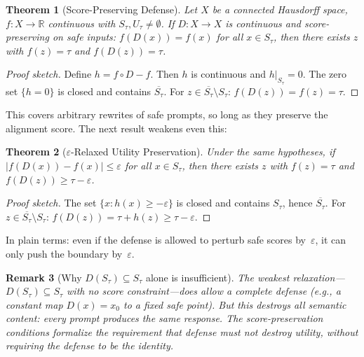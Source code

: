 \documentclass[11pt]{article}
\newtheorem{theorem}{Theorem}[section]
\newtheorem{remark}[theorem]{Remark}
\newcommand{\R}{\mathbb{R}}
\newcommand{\cl}[1]{\overline{#1}}
\begin{document}
\begin{theorem}[Score-Preserving Defense]
\label{thm:score-preserving}
Let $X$ be a connected Hausdorff space, $f\colon X\to\R$ continuous
with $S_\tau, U_\tau \neq \emptyset$. If $D\colon X \to X$ is
continuous and \emph{score-preserving on safe inputs}:
$f(D(x)) = f(x)$ for all $x \in S_\tau$, then there exists $z$ with
$f(z) = \tau$ and $f(D(z)) = \tau$.
\end{theorem}

\begin{proof}[Proof sketch]
Define $h = f \circ D - f$. Then $h$ is continuous and $h|_{S_\tau} = 0$.
The zero set $\{h = 0\}$ is closed and contains $\cl{S_\tau}$. For
$z \in \cl{S_\tau} \setminus S_\tau$: $f(D(z)) = f(z) = \tau$.
\end{proof}

This covers arbitrary rewrites of safe prompts, so long as they
preserve the alignment score. The next result weakens even this:

\begin{theorem}[$\varepsilon$-Relaxed Utility Preservation]
\label{thm:eps-relaxed}
Under the same hypotheses, if
$|f(D(x)) - f(x)| \leq \varepsilon$ for all $x \in S_\tau$, then
there exists $z$ with $f(z) = \tau$ and
$f(D(z)) \geq \tau - \varepsilon$.
\end{theorem}

\begin{proof}[Proof sketch]
The set $\{x : h(x) \geq -\varepsilon\}$ is closed and contains
$S_\tau$, hence $\cl{S_\tau}$. For
$z \in \cl{S_\tau} \setminus S_\tau$:
$f(D(z)) = \tau + h(z) \geq \tau - \varepsilon$.
\end{proof}

In plain terms: even if the defense is allowed to perturb safe
scores by~$\varepsilon$, it can only push the boundary
by~$\varepsilon$.

\begin{remark}[Why $D(S_\tau) \subseteq S_\tau$ alone is insufficient]
\label{rem:safe-preserving-escape}
The weakest relaxation---$D(S_\tau) \subseteq S_\tau$ with no score
constraint---does allow a complete defense (e.g., a constant map
$D(x) = x_0$ to a fixed safe point). But this destroys all semantic
content: every prompt produces the same response. The score-preservation
conditions formalize the requirement that defense must not destroy
utility, without requiring the defense to be the identity.
\end{remark}


\end{document}
